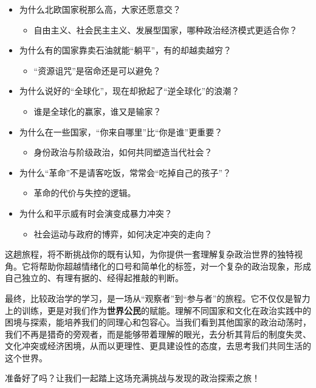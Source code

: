 \begin{itemize}
\begin{itemize}
    \end{itemize}
    \item 为什么北欧国家税那么高，大家还愿意交？
    \begin{itemize}
        \item 自由主义、社会民主主义、发展型国家，哪种政治经济模式更适合你？
    \end{itemize}
    \item 为什么有的国家靠卖石油就能“躺平”，有的却越卖越穷？
    \begin{itemize}
        \item “资源诅咒”是宿命还是可以避免？
    \end{itemize}
    \item 为什么说好的“全球化”，现在却掀起了“逆全球化”的浪潮？
    \begin{itemize}
        \item 谁是全球化的赢家，谁又是输家？
    \end{itemize}
    \item 为什么在一些国家，“你来自哪里”比“你是谁”更重要？
    \begin{itemize}
        \item 身份政治与阶级政治，如何共同塑造当代社会？
    \end{itemize}
    \item 为什么“革命”不是请客吃饭，常常会“吃掉自己的孩子”？
    \begin{itemize}
        \item 革命的代价与失控的逻辑。
    \end{itemize}
    \item 为什么和平示威有时会演变成暴力冲突？
    \begin{itemize}
        \item 社会运动与政府的博弈，如何决定冲突的走向？
    \end{itemize}
\end{itemize}

这趟旅程，将不断挑战你的既有认知，为你提供一套理解复杂政治世界的独特视角。它将帮助你超越情绪化的口号和简单化的标签，对一个复杂的政治现象，形成自己独立的、有理有据的、经得起推敲的判断。

最终，比较政治学的学习，是一场从“观察者”到“参与者”的旅程。它不仅仅是智力上的训练，更是对我们作为\textbf{世界公民}的赋能。理解不同国家和文化在政治实践中的困境与探索，能培养我们的同理心和包容心。当我们看到其他国家的政治动荡时，我们不再是猎奇的旁观者，而是能够带着理解的眼光，去分析其背后的制度失灵、文化冲突或经济困境，从而以更理性、更具建设性的态度，去思考我们共同生活的这个世界。

准备好了吗？让我们一起踏上这场充满挑战与发现的政治探索之旅！

